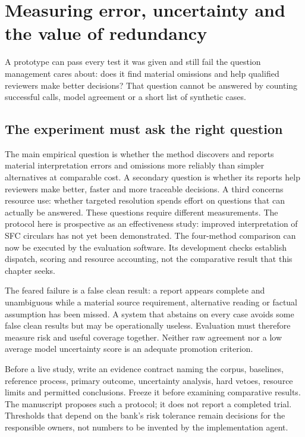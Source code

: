 \chapter{Measuring error, uncertainty and the value of redundancy}
\label{ch:evaluation}

A prototype can pass every test it was given and still fail the question
management cares about: does it find material omissions and help qualified
reviewers make better decisions? That question cannot be answered by counting
successful calls, model agreement or a short list of synthetic cases.

\section{The experiment must ask the right question}
\label{merge:M09:00}


The main empirical question is whether the method discovers and reports material
interpretation errors and omissions more reliably than simpler alternatives at
comparable cost. A secondary question is whether its reports help reviewers make
better, faster and more traceable decisions. A third concerns resource use:
whether targeted resolution spends effort on questions that can actually be
answered. These questions require different measurements. The protocol here is
prospective as an effectiveness study: improved interpretation of SFC circulars
has not yet been demonstrated. The four-method comparison can now be executed
by the evaluation software. Its development checks establish dispatch, scoring
and resource accounting, not the comparative result that this chapter seeks.


The feared failure is a false clean result: a report appears complete and
unambiguous while a material source requirement, alternative reading or factual
assumption has been missed. A system that abstains on every case avoids some false
clean results but may be operationally useless. Evaluation must therefore measure
risk and useful coverage together. Neither raw agreement nor a low average model
uncertainty score is an adequate promotion criterion.

Before a live study, write an evidence contract naming the corpus, baselines,
reference process, primary outcome, uncertainty analysis, hard vetoes, resource
limits and permitted conclusions. Freeze it before examining comparative results.
The manuscript proposes such a protocol; it does not report a completed trial.
Thresholds that depend on the bank's risk tolerance remain decisions for the
responsible owners, not numbers to be invented by the implementation agent.

